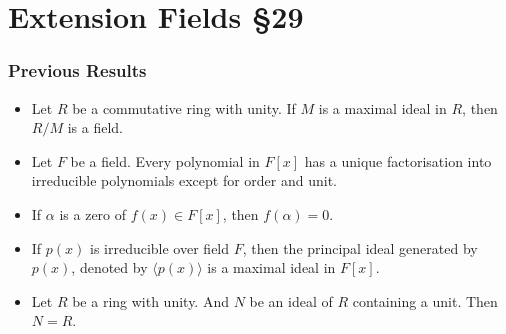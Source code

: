 



\section{Extension Fields \S29}
\subsubsection*{Previous Results}
\begin{itemize}
	\item Let $R$ be a commutative ring with unity. If $M$ is a maximal ideal in $R$, then $R/M$ is a field. \cite[\S27.9]{fraleigh}
	\item Let $F$ be a field. Every polynomial in $F[x]$ has a unique factorisation into irreducible polynomials except for order and unit.\cite[\S27.27]{fraleigh}
	\item If $\alpha$ is a zero of $f(x) \in F[x]$, then $f(\alpha) = 0$.\cite[\S22.10]{fraleigh}
	\item If $p(x)$ is irreducible over field $F$, then the principal ideal generated by $p(x)$, denoted by $\langle p(x) \rangle$ is a maximal ideal in $F[x]$. \cite[\S27.25]{fraleigh}
	\item Let $R$ be a ring with unity. And $N$ be an ideal of $R$ containing a unit. Then $N = R$.\cite[\S27.5]{fraleigh}
\end{itemize}

